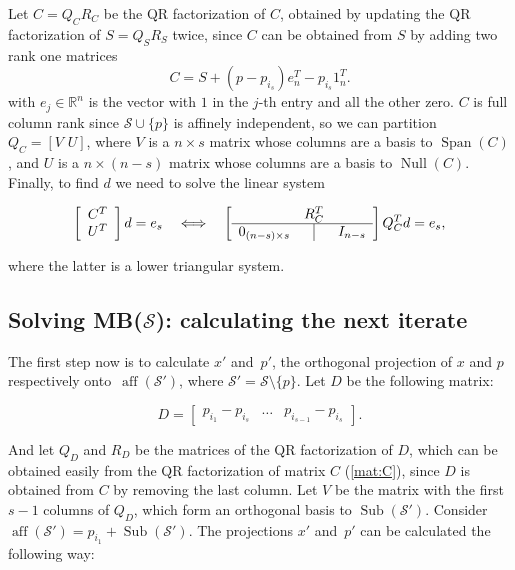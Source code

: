 \noindent Let $C = Q_{C}R_{{C}}$ be the QR factorization of ${C}$, obtained by updating the QR factorization of $S=Q_SR_S$ twice, since $C$ can be obtained from $S$ by adding two rank one matrices
$${C} = S + ({{p}}-p_{i_s})e_n^T - p_{i_s}1_n^T.$$
\noindent with $e_j\in{\mathbb{R}}^n$ is the vector with $1$ in the $j$-th entry and all the other zero. ${C}$ is full column rank since ${\mathcal{S}}\cup\{{{p}}\}$ is affinely independent, so we can partition $Q_{C}=[V\,\,  U]$, where $V$ is a $n\times s$ matrix whose columns are a basis to ${\operatorname{Span}}(C)$, and $U$ is a $n\times(n-s)$ matrix whose columns are a basis to ${\operatorname{Null}}(C)$. Finally, to find $d$ we need to solve the linear system

\begin{equation*}\label{ls:C}
\left[\begin{array}{c}
C^T\\
U^T
\end{array}\right] d=e_{s}\quad\Longleftrightarrow\quad
\left[\begin{array}{ccc}
& R_C^T&\\
\hline
0_{(n-s)\times s} & \vline &I_{n-s}
\end{array}\right]Q_C^T d = e_s,\end{equation*}

\noindent where the latter is a lower triangular system.
	
		
\subsection{Solving MB(${\mathcal{S}}$): calculating the next iterate}\label{subsec:app3}
		
The first step now is to calculate $x'$ and~${{p}}'$, the orthogonal projection of $x$ and ${{p}}$ respectively onto~${\operatorname{aff}}({\mathcal{S}}')$, where ${\mathcal{S}}'={\mathcal{S}}\setminus\{{{p}}\}$. Let $D$ be the following matrix:
	
\begin{equation*}\label{mat:D}
D = \left[\begin{array}{ccc}
p_{i_1}-p_{i_s}& \dots & p_{i_{s-1}}-p_{i_s}
\end{array}\right].
\end{equation*}

\noindent And let $Q_D$ and $R_D$ be the matrices of the QR factorization of $D$, which can be obtained easily from the QR factorization of matrix $C$ (\ref{mat:C}), since $D$ is obtained from $C$ by removing the last column. Let $V$ be the matrix with the first $s-1$ columns of $Q_D$, which form an orthogonal basis to ${\operatorname{Sub}}({\mathcal{S}}')$. Consider ${\operatorname{aff}}({\mathcal{S}}')=p_{i_1}+{\operatorname{Sub}}({\mathcal{S}}')$. The projections $x'$ and~${{p}}'$ can be calculated the following way:

